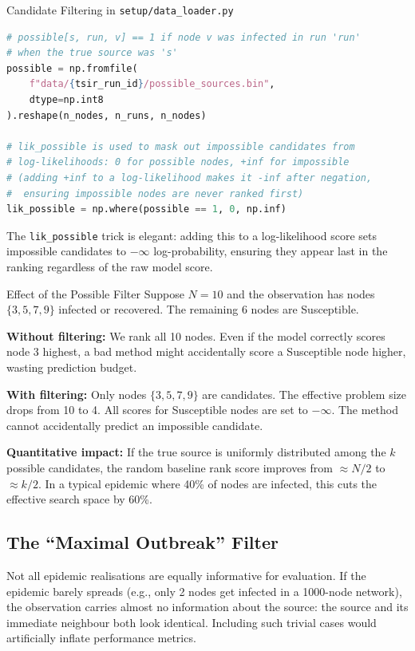 \begin{codewalk}{Candidate Filtering in \texttt{setup/data\_loader.py}}
\begin{lstlisting}[language=Python]
# possible[s, run, v] == 1 if node v was infected in run 'run'
# when the true source was 's'
possible = np.fromfile(
    f"data/{tsir_run_id}/possible_sources.bin",
    dtype=np.int8
).reshape(n_nodes, n_runs, n_nodes)

# lik_possible is used to mask out impossible candidates from
# log-likelihoods: 0 for possible nodes, +inf for impossible
# (adding +inf to a log-likelihood makes it -inf after negation,
#  ensuring impossible nodes are never ranked first)
lik_possible = np.where(possible == 1, 0, np.inf)
\end{lstlisting}

The \texttt{lik\_possible} trick is elegant: adding this to a log-likelihood
score sets impossible candidates to $-\infty$ log-probability, ensuring they
appear last in the ranking regardless of the raw model score.
\end{codewalk}

\begin{examplebox}{Effect of the Possible Filter}
Suppose $N = 10$ and the observation has nodes $\{3, 5, 7, 9\}$ infected or
recovered. The remaining 6 nodes are Susceptible.

\textbf{Without filtering:} We rank all 10 nodes. Even if the model correctly
scores node 3 highest, a bad method might accidentally score a Susceptible
node higher, wasting prediction budget.

\textbf{With filtering:} Only nodes $\{3, 5, 7, 9\}$ are candidates. The
effective problem size drops from 10 to 4. All scores for Susceptible nodes
are set to $-\infty$. The method cannot accidentally predict an impossible
candidate.

\textbf{Quantitative impact:} If the true source is uniformly distributed
among the $k$ possible candidates, the random baseline rank score improves
from $\approx N/2$ to $\approx k/2$. In a typical epidemic where 40\% of
nodes are infected, this cuts the effective search space by 60\%.
\end{examplebox}

\subsection{The ``Maximal Outbreak'' Filter}

Not all epidemic realisations are equally informative for evaluation. If the
epidemic barely spreads (e.g., only 2 nodes get infected in a 1000-node
network), the observation carries almost no information about the source:
the source and its immediate neighbour both look identical. Including such
trivial cases would artificially inflate performance metrics.

